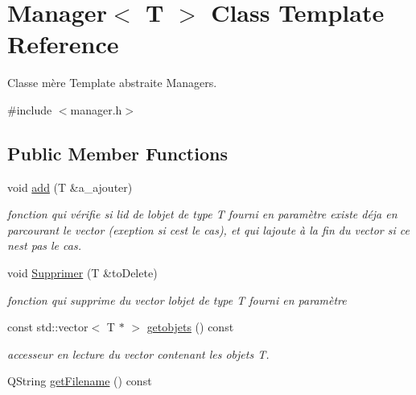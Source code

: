 \hypertarget{class_manager}{}\section{Manager$<$ T $>$ Class Template Reference}
\label{class_manager}


Classe mère Template abstraite Managers.  




{\ttfamily \#include $<$manager.\+h$>$}

\subsection*{Public Member Functions}
\begin{DoxyCompactItemize}
\item 
void \hyperlink{class_manager_a4eac07f3408be9a9c86273383e282b53}{add} (T \&a\+\_\+ajouter)
\begin{DoxyCompactList}\small\item\em fonction qui vérifie si l\textquotesingle{}id de l\textquotesingle{}objet de type T fourni en paramètre existe déja en parcourant le vector (exeption si c\textquotesingle{}est le cas), et qui l\textquotesingle{}ajoute à la fin du vector si ce n\textquotesingle{}est pas le cas. \end{DoxyCompactList}\item 
void \hyperlink{class_manager_a5ad1071a0ca361daea98576c433774c8}{Supprimer} (T \&to\+Delete)
\begin{DoxyCompactList}\small\item\em fonction qui supprime du vector l\textquotesingle{}objet de type T fourni en paramètre \end{DoxyCompactList}\item 
\mbox{\label{class_manager_a53786650c42236c2c346cda79cb3cee3}} 
const std\+::vector$<$ T $\ast$ $>$ \hyperlink{class_manager_a53786650c42236c2c346cda79cb3cee3}{getobjets} () const
\begin{DoxyCompactList}\small\item\em accesseur en lecture du vector contenant les objets T. \end{DoxyCompactList}\item 
\mbox{\label{class_manager_a5f6a3a94521559731ef49005d7669464}} 
Q\+String \hyperlink{class_manager_a5f6a3a94521559731ef49005d7669464}{get\+Filename} () const

\end{DoxyCompactItemize}
